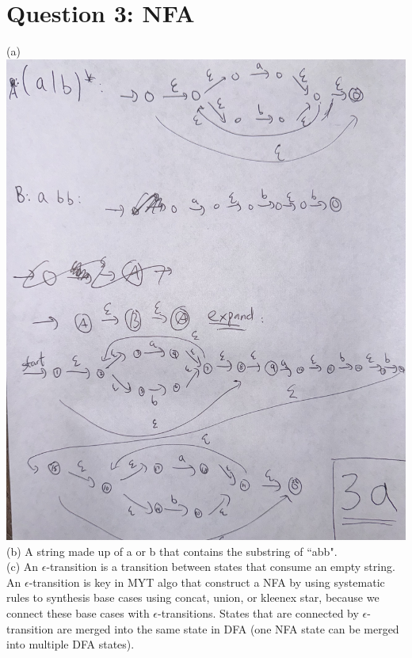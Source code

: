 \documentclass{article}
\begin{document}
\section*{Question 3: NFA}
(a) 
\\
\includegraphics[angle=-90,width=\textwidth]{NFA}
\\
(b) A string made up of a or b that contains the substring of ``abb".
\\
(c) An $\epsilon$-transition is a transition between states that consume an empty string. An $\epsilon$-transition is key in MYT algo that construct a NFA by using systematic rules to synthesis base cases using concat, union, or kleenex star, because we connect these base cases with $\epsilon$-transitions. States that are connected by $\epsilon$-transition are merged into the same state in DFA (one NFA state can be merged into multiple DFA states). 
\end{document}
